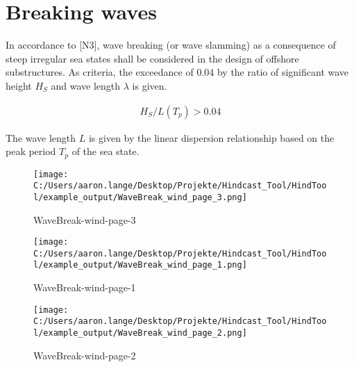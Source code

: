 \section{Breaking waves}
In accordance to [N3], wave breaking (or wave slamming) as a consequence of steep irregular sea states shall be considered in the design of offshore substructures. As criteria, the exceedance of 0.04 by the ratio of significant wave height $H_{S}$ and wave length $\lambda$ is given.

\begin{align}
H_{S} / L\left(T_{p}\right)>0.04
\end{align}

The wave length $L$ is given by the linear dispersion relationship based on the peak period $T_{p}$ of the sea state.\\

\begin{figure}[H] 
 \centering 
 \texttt{[image: C:/Users/aaron.lange/Desktop/Projekte/Hindcast\_Tool/HindTool/example\_output/WaveBreak\_wind\_page\_3.png]} 
 \caption{ WaveBreak-wind-page-3 } 
 \label{fig: WaveBreak_wind_page_3 } 
\end{figure}


\begin{figure}[H] 
 \centering 
 \texttt{[image: C:/Users/aaron.lange/Desktop/Projekte/Hindcast\_Tool/HindTool/example\_output/WaveBreak\_wind\_page\_1.png]} 
 \caption{ WaveBreak-wind-page-1 } 
 \label{fig: WaveBreak_wind_page_1 } 
\end{figure}
\begin{figure}[H] 
 \centering 
 \texttt{[image: C:/Users/aaron.lange/Desktop/Projekte/Hindcast\_Tool/HindTool/example\_output/WaveBreak\_wind\_page\_2.png]} 
 \caption{ WaveBreak-wind-page-2 } 
 \label{fig: WaveBreak_wind_page_2 } 
\end{figure}


